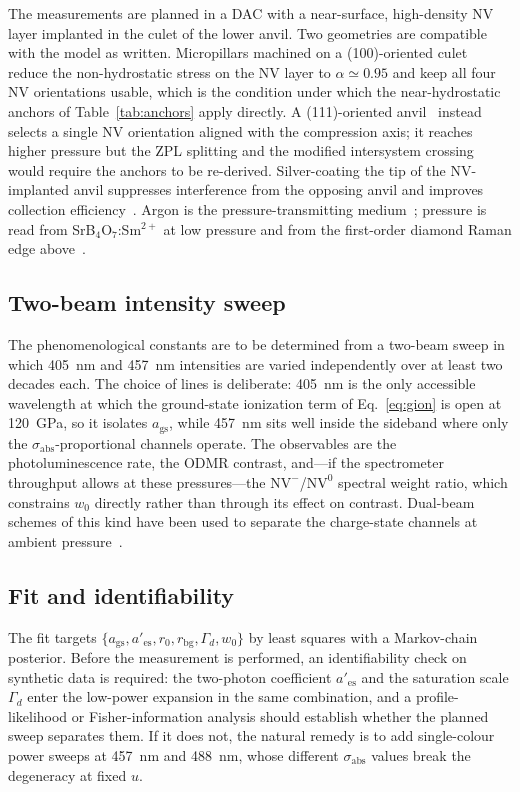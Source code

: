 \documentclass[preprint,12pt]{elsarticle}
\newcommand{\NVm}{\ensuremath{\mathrm{NV}^{-}}}
\newcommand{\NVz}{\ensuremath{\mathrm{NV}^{0}}}
\newcommand{\sabs}{\ensuremath{\sigma_{\mathrm{abs}}}}
\begin{document}
The measurements are planned in a DAC with a near-surface, high-density NV layer
implanted in the culet of the lower anvil. Two geometries are compatible with the
model as written. Micropillars machined on a (100)-oriented
culet~\cite{Hilberer2023} reduce the non-hydrostatic stress on the NV layer to
$\alpha \simeq 0.95$ and keep all four NV orientations usable, which is the
condition under which the near-hydrostatic anchors of Table~\ref{tab:anchors}
apply directly. A (111)-oriented anvil~\cite{Bhattacharyya2024} instead selects a
single NV orientation aligned with the compression axis; it reaches higher
pressure but the ZPL splitting and the modified intersystem
crossing~\cite{Huang2025ISC} would require the anchors to be re-derived.
Silver-coating the tip of the NV-implanted anvil suppresses interference from the
opposing anvil and improves collection efficiency~\cite{Ho2026}. Argon is
the pressure-transmitting medium~\cite{Klotz2009}; pressure is read from
SrB$_4$O$_7$:Sm$^{2+}$ at low pressure and from the first-order diamond Raman
edge above~\cite{Akahama2004}.

\subsection{Two-beam intensity sweep}

The phenomenological constants are to be determined from a two-beam sweep in
which \SI{405}{\nano\meter} and \SI{457}{\nano\meter} intensities are varied
independently over at least two decades each. The choice of lines is deliberate:
\SI{405}{\nano\meter} is the only accessible wavelength at which the
ground-state ionization term of Eq.~\eqref{eq:gion} is open at
\SI{120}{\giga\pascal}, so it isolates $a_{\mathrm{gs}}$, while
\SI{457}{\nano\meter} sits well inside the sideband where only the
$\sabs$-proportional channels operate. The observables are the photoluminescence
rate, the ODMR contrast, and---if the spectrometer throughput allows at these
pressures---the \NVm{}/\NVz{} spectral weight ratio, which constrains $w_0$
directly rather than through its effect on contrast. Dual-beam schemes of this
kind have been used to separate the charge-state channels at ambient
pressure~\cite{Bourgeois2017}.

\subsection{Fit and identifiability}

The fit targets $\{a_{\mathrm{gs}}, a'_{\mathrm{es}}, r_0, r_{\mathrm{bg}},
\Gamma_d, w_0\}$ by least squares with a Markov-chain posterior. Before the
measurement is performed, an identifiability check on synthetic data is required:
the two-photon coefficient $a'_{\mathrm{es}}$ and the saturation scale $\Gamma_d$
enter the low-power expansion in the same combination, and a profile-likelihood
or Fisher-information analysis should establish whether the planned sweep
separates them. If it does not, the natural remedy is to add single-colour power
sweeps at \SI{457}{\nano\meter} and \SI{488}{\nano\meter}, whose different
$\sabs$ values break the degeneracy at fixed $u$.
\end{document}
